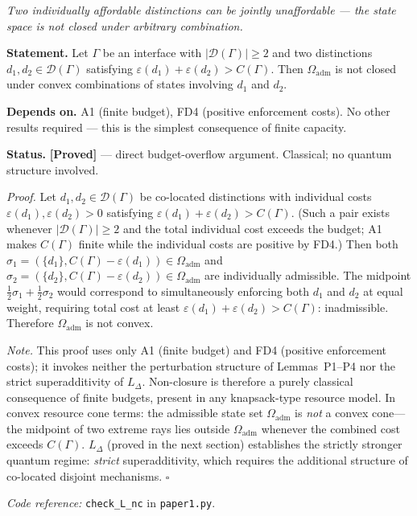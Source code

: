 \documentclass[11pt]{article}
\theoremstyle{remark}
\newcommand{\coderef}[2]{\smallskip\noindent\textit{Code reference:} \texttt{#1} in \texttt{#2}.}
\begin{document}
\begin{tcolorbox}[apfbox, title={Lemma $L_{\mathrm{nc}}$ (Non-Closure)}]
\textit{Two individually affordable distinctions can be jointly unaffordable --- the state space is not closed under arbitrary combination.}

\smallskip\noindent\textbf{Statement.}  Let $\Gamma$ be an interface with $|\mathcal{D}(\Gamma)| \ge 2$ and two distinctions $d_1, d_2 \in \mathcal{D}(\Gamma)$ satisfying $\varepsilon(d_1) + \varepsilon(d_2) > C(\Gamma)$.  Then $\Omega_{\mathrm{adm}}$ is not closed under convex combinations of states involving $d_1$ and $d_2$.

\smallskip\noindent\textbf{Depends on.}  A1 (finite budget), FD4 (positive enforcement costs).  No other results required --- this is the simplest consequence of finite capacity.

\smallskip\noindent\textbf{Status.}  \textbf{[Proved]} --- direct budget-overflow argument.  Classical; no quantum structure involved.

\smallskip\noindent\textit{Proof.}  Let $d_1, d_2 \in \mathcal{D}(\Gamma)$ be co-located distinctions with individual costs $\varepsilon(d_1), \varepsilon(d_2) > 0$ satisfying $\varepsilon(d_1) + \varepsilon(d_2) > C(\Gamma)$.  (Such a pair exists whenever $|\mathcal{D}(\Gamma)| \ge 2$ and the total individual cost exceeds the budget; A1 makes $C(\Gamma)$ finite while the individual costs are positive by FD4.)  Then both $\sigma_1 = (\{d_1\}, C(\Gamma) - \varepsilon(d_1)) \in \Omega_{\mathrm{adm}}$ and $\sigma_2 = (\{d_2\}, C(\Gamma) - \varepsilon(d_2)) \in \Omega_{\mathrm{adm}}$ are individually admissible.  The midpoint $\tfrac{1}{2}\sigma_1 + \tfrac{1}{2}\sigma_2$ would correspond to simultaneously enforcing both $d_1$ and $d_2$ at equal weight, requiring total cost at least $\varepsilon(d_1) + \varepsilon(d_2) > C(\Gamma)$: inadmissible.  Therefore $\Omega_{\mathrm{adm}}$ is not convex.

\smallskip\noindent\textit{Note.}  This proof uses only A1 (finite budget) and FD4 (positive enforcement costs); it invokes neither the perturbation structure of Lemmas~P1--P4 nor the strict superadditivity of $L_\Delta$.  Non-closure is therefore a purely classical consequence of finite budgets, present in any knapsack-type resource model.  In convex resource cone terms: the admissible state set $\Omega_{\mathrm{adm}}$ is \emph{not} a convex cone---the midpoint of two extreme rays lies outside $\Omega_{\mathrm{adm}}$ whenever the combined cost exceeds $C(\Gamma)$.  $L_\Delta$ (proved in the next section) establishes the strictly stronger quantum regime: \emph{strict} superadditivity, which requires the additional structure of co-located disjoint mechanisms.  \hfill$\square$

\coderef{check\_L\_nc}{paper1.py}
\end{tcolorbox}
\end{document}
